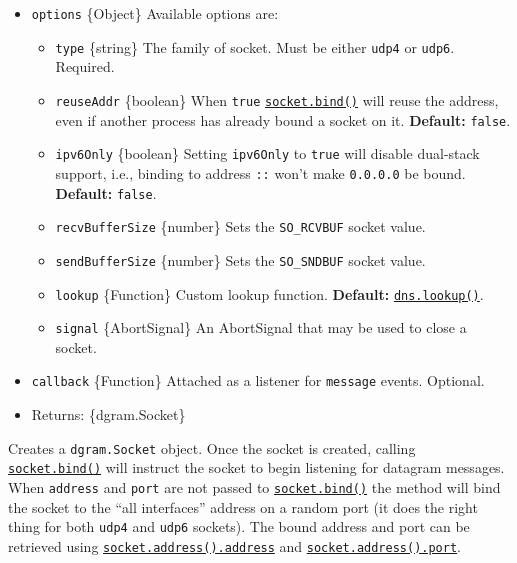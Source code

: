 \begin{itemize}
\tightlist
\item
  \texttt{options} \{Object\} Available options are:

  \begin{itemize}
  \tightlist
  \item
    \texttt{type} \{string\} The family of socket. Must be either
    \texttt{\textquotesingle{}udp4\textquotesingle{}} or
    \texttt{\textquotesingle{}udp6\textquotesingle{}}. Required.
  \item
    \texttt{reuseAddr} \{boolean\} When \texttt{true}
    \hyperref[socketbindport-address-callback]{\texttt{socket.bind()}}
    will reuse the address, even if another process has already bound a
    socket on it. \textbf{Default:} \texttt{false}.
  \item
    \texttt{ipv6Only} \{boolean\} Setting \texttt{ipv6Only} to
    \texttt{true} will disable dual-stack support, i.e., binding to
    address \texttt{::} won't make \texttt{0.0.0.0} be bound.
    \textbf{Default:} \texttt{false}.
  \item
    \texttt{recvBufferSize} \{number\} Sets the \texttt{SO\_RCVBUF}
    socket value.
  \item
    \texttt{sendBufferSize} \{number\} Sets the \texttt{SO\_SNDBUF}
    socket value.
  \item
    \texttt{lookup} \{Function\} Custom lookup function.
    \textbf{Default:}
    \href{dns.md\#dnslookuphostname-options-callback}{\texttt{dns.lookup()}}.
  \item
    \texttt{signal} \{AbortSignal\} An AbortSignal that may be used to
    close a socket.
  \end{itemize}
\item
  \texttt{callback} \{Function\} Attached as a listener for
  \texttt{\textquotesingle{}message\textquotesingle{}} events. Optional.
\item
  Returns: \{dgram.Socket\}
\end{itemize}

Creates a \texttt{dgram.Socket} object. Once the socket is created,
calling
\hyperref[socketbindport-address-callback]{\texttt{socket.bind()}} will
instruct the socket to begin listening for datagram messages. When
\texttt{address} and \texttt{port} are not passed to
\hyperref[socketbindport-address-callback]{\texttt{socket.bind()}} the
method will bind the socket to the ``all interfaces'' address on a
random port (it does the right thing for both \texttt{udp4} and
\texttt{udp6} sockets). The bound address and port can be retrieved
using \hyperref[socketaddress]{\texttt{socket.address().address}} and
\hyperref[socketaddress]{\texttt{socket.address().port}}.

